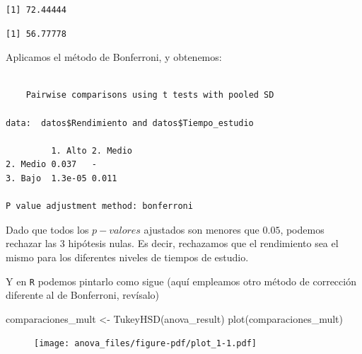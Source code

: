 \documentclass[
  letterpaper,
  DIV=11,
  numbers=noendperiod]{scrreprt}
\newenvironment{Shaded}{\begin{snugshade}}{\end{snugshade}}
\newcommand{\AttributeTok}[1]{\textcolor[rgb]{0.40,0.45,0.13}{#1}}
\newcommand{\FunctionTok}[1]{\textcolor[rgb]{0.28,0.35,0.67}{#1}}
\newcommand{\NormalTok}[1]{\textcolor[rgb]{0.00,0.23,0.31}{#1}}
\newcommand{\OtherTok}[1]{\textcolor[rgb]{0.00,0.23,0.31}{#1}}
\newcommand{\SpecialCharTok}[1]{\textcolor[rgb]{0.37,0.37,0.37}{#1}}
\newcommand{\StringTok}[1]{\textcolor[rgb]{0.13,0.47,0.30}{#1}}
\begin{document}
\begin{tcolorbox}
\begin{verbatim}
[1] 72.44444
\end{verbatim}

\begin{Shaded}
\end{Shaded}

\begin{verbatim}
[1] 56.77778
\end{verbatim}

Aplicamos el método de Bonferroni, y obtenemos:

\begin{Shaded}
\end{Shaded}

\begin{verbatim}

    Pairwise comparisons using t tests with pooled SD 

data:  datos$Rendimiento and datos$Tiempo_estudio 

         1. Alto 2. Medio
2. Medio 0.037   -       
3. Bajo  1.3e-05 0.011   

P value adjustment method: bonferroni 
\end{verbatim}

Dado que todos los \(p-valores\) ajustados son menores que \(0.05\),
podemos rechazar las \(3\) hipótesis nulas. Es decir, rechazamos que el
rendimiento sea el mismo para los diferentes niveles de tiempos de
estudio.

Y en \texttt{R} podemos pintarlo como sigue (aquí empleamos otro método
de corrección diferente al de Bonferroni, revísalo)

\begin{Shaded}
\begin{Highlighting}[]
\NormalTok{comparaciones\_mult }\OtherTok{\textless{}{-}} \FunctionTok{TukeyHSD}\NormalTok{(anova\_result)}
\FunctionTok{plot}\NormalTok{(comparaciones\_mult)}
\end{Highlighting}
\end{Shaded}

\begin{figure}[H]

{\centering \texttt{[image: anova\_files/figure-pdf/plot\_1-1.pdf]}

}

\end{figure}

\end{tcolorbox}
\end{document}
